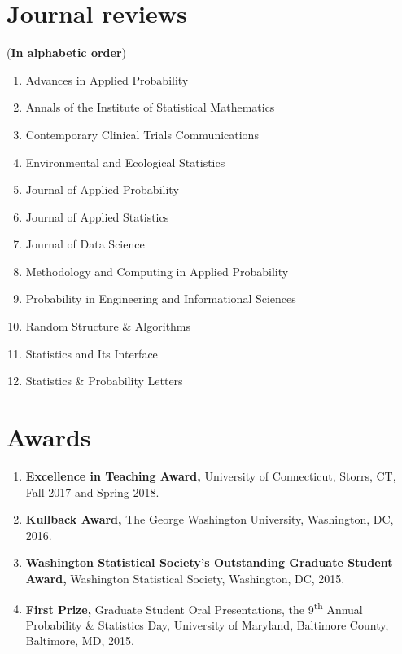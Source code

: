 \documentclass[margin]{res}
\begin{document}
\begin{resume}
\section{Journal reviews}
({\bf In alphabetic order})
\begin{enumerate}
	\item Advances in Applied Probability
	\item Annals of the Institute of Statistical Mathematics
	\item Contemporary Clinical Trials Communications
	\item Environmental and Ecological Statistics
	\item Journal of Applied Probability
	\item Journal of Applied Statistics 
	\item Journal of Data Science
	\item Methodology and Computing in Applied Probability
	\item Probability in Engineering and Informational Sciences
	\item Random Structure \& Algorithms
	\item Statistics and Its Interface
	\item Statistics \& Probability Letters
\end{enumerate}

\section{Awards}
\begin{enumerate}
	\item {\bf Excellence in Teaching Award,} University of Connecticut, Storrs, CT, Fall 2017 and Spring 2018.
	\item {\bf Kullback Award,} The George Washington University, Washington, DC, 2016.
	\item {\bf Washington Statistical Society's Outstanding Graduate Student Award,} Washington Statistical Society, Washington, DC, 2015.
	\item {\bf First Prize,} Graduate Student Oral Presentations, the 9\textsuperscript{th} Annual Probability \& Statistics Day,  University of Maryland, Baltimore County, Baltimore, MD, 2015.
\end{enumerate}
\end{resume} 
\end{document}
